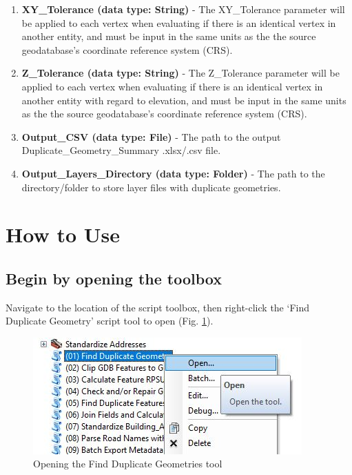 \documentclass[openany]{book}
\theoremstyle{definition}
\theoremstyle{definition}
\theoremstyle{definition}
\theoremstyle{remark}
\begin{document}
\begin{enumerate}
\def\labelenumi{\arabic{enumi}.}
\setcounter{enumi}{1}
\item
  \textbf{XY\_Tolerance (data type: String)} - The XY\_Tolerance
  parameter will be applied to each vertex when evaluating if there is
  an identical vertex in another entity, and must be input in the same
  units as the the source geodatabase's coordinate reference system
  (CRS).
\item
  \textbf{Z\_Tolerance (data type: String)} - The Z\_Tolerance parameter
  will be applied to each vertex when evaluating if there is an
  identical vertex in another entity with regard to elevation, and must
  be input in the same units as the the source geodatabase's coordinate
  reference system (CRS).
\item
  \textbf{Output\_CSV (data type: File)} - The path to the output
  Duplicate\_Geometry\_Summary .xlsx/.csv file.
\item
  \textbf{Output\_Layers\_Directory (data type: Folder)} - The path to
  the directory/folder to store layer files with duplicate geometries.
\end{enumerate}

\section{How to Use}\label{how-to-use-3}

\subsection{Begin by opening the
toolbox}\label{begin-by-opening-the-toolbox-3}

Navigate to the location of the script toolbox, then right-click the
`Find Duplicate Geometry' script tool to open (Fig. \ref{fig:dupGopen}).

\begin{figure}[H]

{\centering \includegraphics{figures/dupG-opentool} 

}

\caption{Opening the Find Duplicate Geometries tool}\label{fig:dupGopen}
\end{figure}
\end{document}
